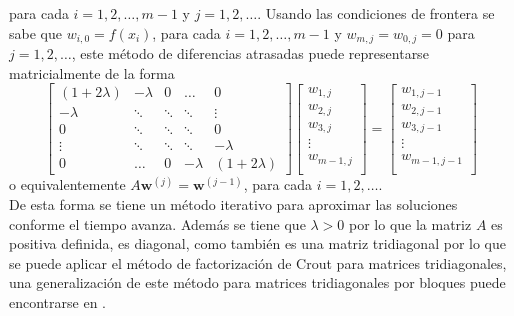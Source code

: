 \documentclass[a4paper]{article}
\begin{document}
para cada $i=1,2,\hdots,m-1$ y $j=1,2,\hdots$. Usando las condiciones de frontera se sabe que $w_{i,0}=f(x_i)$, para cada  
$i=1,2,\hdots,m-1$ y $w_{m,j}=w_{0,j}=0$ para $j=1,2,\hdots$, este método de diferencias atrasadas puede representarse matricialmente de la forma
\begin{equation}
\begin{bmatrix}
(1+2\lambda) & -\lambda & 0 &\dots&0 \\
-\lambda     &\ddots    & \ddots& \ddots&\vdots\\
0&\ddots&\ddots&\ddots&0\\
\vdots&\ddots&\ddots&\ddots&-\lambda\\
0&\dots&0&-\lambda&(1+2\lambda)
\end{bmatrix}
\begin{bmatrix}
w_{1,j}\\
w_{2,j}\\
w_{3,j}\\
\vdots\\
w_{m-1,j}\\
\end{bmatrix}=
\begin{bmatrix}
w_{1,j-1}\\
w_{2,j-1}\\
w_{3,j-1}\\
\vdots\\
w_{m-1,j-1}\\
\end{bmatrix}
\end{equation}
o equivalentemente $A\mathbf{w}^{(j)}=\mathbf{w}^{(j-1)}$, para cada $i=1,2,\hdots$.\\
De esta forma se tiene un método iterativo para aproximar las soluciones conforme el tiempo avanza. Además se tiene que $\lambda>0$ por lo que la matriz $A$ es positiva definida, es diagonal, como también es una matriz tridiagonal por lo que se puede aplicar el método de factorización de Crout para matrices tridiagonales, una generalización de este método para matrices tridiagonales por bloques puede encontrarse en \cite{Medina}.
\end{document}
